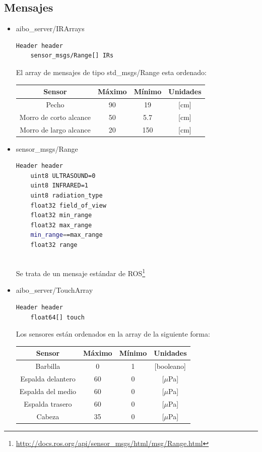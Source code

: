 \documentclass[12pt,a4paper,final,twoside]{book}
\begin{document}
\subsection{Mensajes}
\begin{itemize}
\item aibo{\_}server/IRArrays

\begin{lstlisting}[language=bash]
	Header header
	sensor_msgs/Range[] IRs
\end{lstlisting}

El array de mensajes de tipo std{\_}msgs/Range esta ordenado:

\begin{table}[H]
\begin{center}
\begin{tabulary}{\textwidth}{|C|C|C|C|}
\hline
\textbf{Sensor}&\textbf{Máximo} & \textbf{Mínimo} & \textbf{Unidades} \\ \hline
Pecho & 90& 19& [cm] \\ \hline
Morro de corto alcance & 50& 5.7& [cm] \\ \hline
Morro de largo alcance & 20& 150& [cm] \\ \hline

\end{tabulary}
\end{center}
\end{table}
\item sensor{\_}msgs/Range
\begin{lstlisting}[language=bash]
	Header header         
	uint8 ULTRASOUND=0
	uint8 INFRARED=1
	uint8 radiation_type             
	float32 field_of_view  
	float32 min_range      
	float32 max_range      
	min_range==max_range
	float32 range           
                       
\end{lstlisting}
Se trata de un mensaje estándar de ROS\footnote{\url{http://docs.ros.org/api/sensor_msgs/html/msg/Range.html}}
\item aibo{\_}server/TouchArray

\begin{lstlisting}[language=bash]
	Header header
	float64[] touch
\end{lstlisting}


Los sensores están ordenados en la array de la siguiente forma:


\begin{table}[H]
\begin{center}
\begin{tabulary}{\textwidth}{|C|C|C|C|}
\hline
\textbf{Sensor}&\textbf{Máximo} & \textbf{Mínimo} & \textbf{Unidades} \\ \hline
Barbilla & 0& 1& [booleano] \\ \hline
Espalda delantero & 60& 0& [$\mu$Pa] \\ \hline
Espalda del medio & 60&0& [$\mu$Pa] \\ \hline
Espalda trasero & 60& 0& [$\mu$Pa] \\ \hline
Cabeza & 35& 0& [$\mu$Pa] \\ \hline
\end{tabulary}
\end{center}
\end{table}


\end{itemize}
\end{document}
